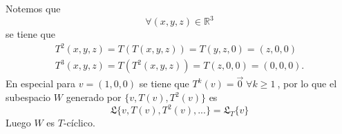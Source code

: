 \documentclass[11pt]{article}
\newcommand{\R}{\mathbb{R}}
\begin{document}
\begin{Solucion}
Notemos que \[ \forall (x,y,z) \in \R^3\] se tiene que 
\begin{align*}
  T^2(x,y,z)=T(T(x,y,z))=T(y,z,0)=(z,0,0)\\
  T^3(x,y,z)=T(T^2(x,y,z))=T(z,0,0)=(0,0,0).
\end{align*}
En especial para \( v = (1, 0, 0) \) se tiene que \(T^k(v)=\vec{0}\; \forall k\geq 1 \ \), por lo que el subespacio \(W\) generado por \( \{v, T(v), T^2(v)\} \) es
\[\mathfrak{L} \{ v, T(v),T^2(v),... \}=\mathfrak{L}_T\{v\}  \]
Luego \(W\) es \( T \)-cíclico.
\end{Solucion}
\end{document}
